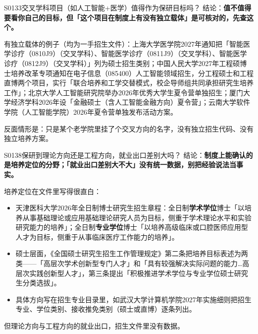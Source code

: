 \begin{qa}{S0133}{交叉学科项目（如人工智能+医学）值得作为保研目标吗？}
结论：\textbf{值不值得要看你自己的目标，但「这个项目在制度上有没有独立载体」是可核对的，先查这个。}

有独立载体的例子（均为一手招生文件）：上海大学医学院2027年通知把「智能医学诊疗（0810J9）（交叉学科）、智能医学诊疗（0811J9）（交叉学科）、智能医学诊疗（0812J9）（交叉学科）」列为硕士招生类别；中国人民大学2027年工程硕博士培养改革专项通知在电子信息（085400）人工智能领域招生，分工程硕士和工程直博两个项目，实行「联合培养和工学交替模式，校企导师组共同承担研究生培养工作」；北京大学人工智能研究院举办2026年优秀大学生夏令营单独招生；厦门大学经济学科2026年设「金融硕士（含人工智能金融方向）夏令营」；云南大学软件学院（人工智能学院）2026年夏令营单独发布活动方案。

反面情形是：只是某个老学院里挂了个交叉方向的名字，没有独立招生代码、没有独立培养方案。
\end{qa}

\begin{qa}{S0138}{保研到理论方向还是工程方向，就业出口差别大吗？}
结论：\textbf{制度上能确认的是培养定位的分野；「就业出口差别大不大」没有统一数据，别把经验说法当事实。}

培养定位在文件里写得很直白：
\begin{itemize}
  \item 天津医科大学2026年全日制博士研究生招生章程：全日制\textbf{学术学位}博士「以培养从事基础理论或应用基础理论研究人员为目标，侧重于学术理论水平和实验研究能力的培养」；全日制\textbf{专业学位}博士「以培养高级临床或口腔医师应用型人才为目标，侧重于从事临床医疗工作能力的培养」。
  \item 硕士层面，《全国硕士研究生招生工作管理规定》第二条把培养目标表述为两类——「高层次学术创新型专门人才」和「具有较强解决实际问题的能力…高层次实践创新型人才」，第三条提出「积极推进学术学位与专业学位硕士研究生分类选拔」。
  \item 具体方向写在招生专业目录里，如武汉大学计算机学院2027年实施细则把招生专业、学位类别、接收推免类别（硕士或直博）逐条列出。
\end{itemize}

但理论方向与工程方向的就业出口，招生文件里没有数据。
\end{qa}

